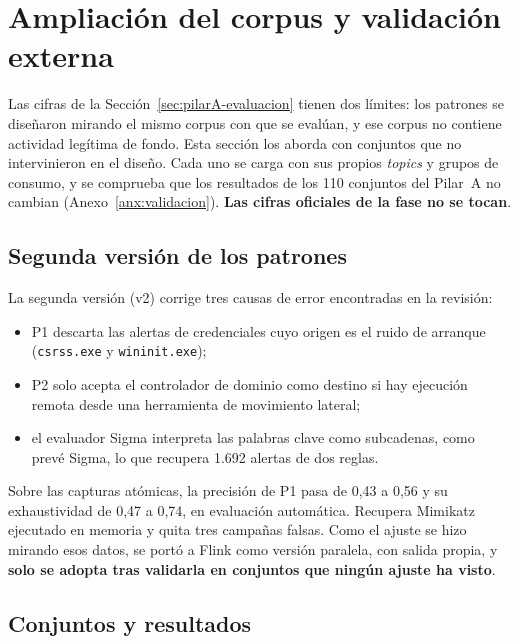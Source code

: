 \section{Ampliación del corpus y validación externa}
\label{sec:validacion-externa}

Las cifras de la Sección~\ref{sec:pilarA-evaluacion} tienen dos límites: los patrones se diseñaron
mirando el mismo corpus con que se evalúan, y ese corpus no contiene actividad legítima de fondo.
Esta sección los aborda con conjuntos que no intervinieron en el diseño. Cada uno se carga con sus
propios \textit{topics} y grupos de consumo, y se comprueba que los resultados de los 110 conjuntos
del Pilar~A no cambian (Anexo~\ref{anx:validacion}). \textbf{Las cifras oficiales de la fase no se
tocan}.

\subsection{Segunda versión de los patrones}
\label{sec:pilarA-v2}

La segunda versión (v2) corrige tres causas de error encontradas en la revisión:
\begin{itemize}
    \item P1 descarta las alertas de credenciales cuyo origen es el ruido de arranque
    (\texttt{csrss.exe} y \texttt{wininit.exe});
    \item P2 solo acepta el controlador de dominio como destino si hay ejecución remota desde una
    herramienta de movimiento lateral;
    \item el evaluador Sigma interpreta las palabras clave como subcadenas, como prevé Sigma, lo
    que recupera 1.692 alertas de dos reglas.
\end{itemize}
Sobre las capturas atómicas, la precisión de P1 pasa de 0,43 a 0,56 y su exhaustividad de 0,47 a
0,74, en evaluación automática. Recupera Mimikatz ejecutado en memoria y quita tres campañas
falsas. Como el ajuste se hizo mirando esos datos, se portó a Flink como versión paralela, con
salida propia, y \textbf{solo se adopta tras validarla en conjuntos que ningún ajuste ha visto}.

\subsection{Conjuntos y resultados}

